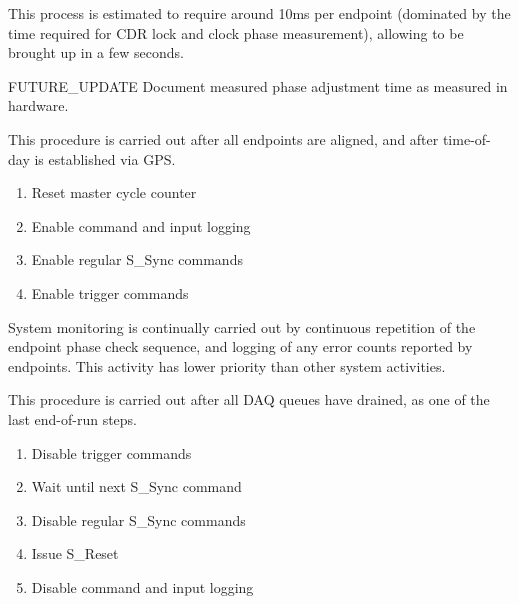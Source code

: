 \documentclass{dune}
\begin{document}
This process is estimated to require around 10ms per endpoint (dominated by the time required for CDR lock and clock phase measurement), allowing  to be brought up in a few seconds.

{\color{red}FUTURE\_UPDATE} Document measured phase adjustment time as measured in hardware.


This procedure is carried out after all endpoints are aligned, and after time-of-day is established via GPS.

\begin{enumerate}
	\item Reset master cycle counter
	\item Enable command and input logging
	\item Enable regular S\_Sync commands
	\item Enable trigger commands
\end{enumerate}


System monitoring is continually carried out by continuous repetition of the endpoint phase check sequence, and logging of any error counts reported by endpoints. This activity has lower priority than other system activities.


This procedure is carried out after all DAQ queues have drained, as one of the last end-of-run steps.

\begin{enumerate} 
	\item Disable trigger commands
	\item Wait until next S\_Sync command
	\item Disable regular S\_Sync commands
	\item Issue S\_Reset
	\item Disable command and input logging
\end{enumerate}




\clearpage

\printglossary
\printbibliography
\end{document}
